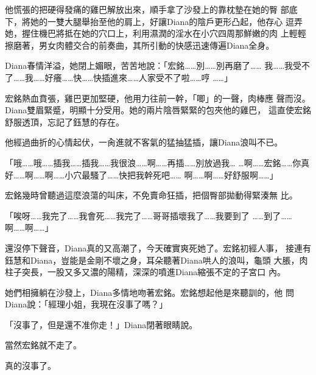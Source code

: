 他慌張的把硬得發痛的雞巴解放出來，順手拿了沙發上的靠枕墊在她的臀
部底下，將她的一雙大腿舉抬至他的肩上，好讓Diana的陰戶更形凸起，他存心
逗弄她，握住機巴將抵在她的穴口上，利用濕潤的淫水在小穴四周那鮮嫩的肉
上輕輕擦磨著，男女肉體交合的前奏曲，其所引動的快感迅速傳遍Diana全身。

Diana春情洋溢，她閉上媚眼，苦苦地說：「宏銘……別……別再磨了……
我……我受不了……我……好癢……快……快插進來……人家受不了啦……哼
……」

宏銘熱血賁張，雞巴更加堅硬，他用力往前一幹，「唧」的一聲，肉棒應
聲而沒。Diana雙眉緊蹙，明顯十分受用。她的兩片陰唇緊緊的包夾他的雞巴，
這直使宏銘舒服透頂，忘記了鈺慧的存在。

他經過曲折的心情起伏，一肏進就不客氣的猛抽猛插，讓Diana浪叫不已。

「哦……哦……插我……插我……我很浪……啊……再插……別放過我…
…啊……宏銘……你真好……啊……啊……小穴最騷了……快把我幹死吧……
啊……啊……好舒服啊……」

宏銘幾時曾聽過這麼浪蕩的叫床，不免賣命狂插，把個臀部拋動得緊湊無
比。

「唉呀……我完了……我會死……我完了……哥哥插壞我了……我要到了
……到了……啊……啊……」

還沒停下聲音，Diana真的又高潮了，今天確實爽死她了。宏銘初經人事，
接連有鈺慧和Diana，豈能是金剛不壞之身，耳朵聽著Diana哄人的浪叫，龜頭
大脹，肉柱子突長，一股又多又濃的陽精，深深的噴進Diana縮張不定的子宮口
內。

她們相擁躺在沙發上，Diana多情地吻著宏銘。宏銘想起他是來聽訓的，他
問Diana說：「經理小姐，我現在沒事了嗎？」

「沒事了，但是還不准你走！」Diana閉著眼睛說。

當然宏銘就不走了。

真的沒事了。











